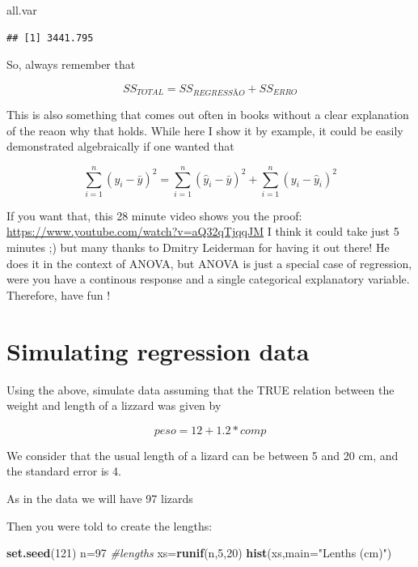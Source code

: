 \documentclass[
]{book}
\newenvironment{Shaded}{\begin{snugshade}}{\end{snugshade}}
\newcommand{\CommentTok}[1]{\textcolor[rgb]{0.56,0.35,0.01}{\textit{#1}}}
\newcommand{\DataTypeTok}[1]{\textcolor[rgb]{0.13,0.29,0.53}{#1}}
\newcommand{\DecValTok}[1]{\textcolor[rgb]{0.00,0.00,0.81}{#1}}
\newcommand{\KeywordTok}[1]{\textcolor[rgb]{0.13,0.29,0.53}{\textbf{#1}}}
\newcommand{\NormalTok}[1]{#1}
\newcommand{\StringTok}[1]{\textcolor[rgb]{0.31,0.60,0.02}{#1}}
\begin{document}
\begin{Shaded}
\begin{Highlighting}[]
\NormalTok{all.var}
\end{Highlighting}
\end{Shaded}

\begin{verbatim}
## [1] 3441.795
\end{verbatim}

So, always remember that

\[SS_{TOTAL}=SS_{REGRESSÃO}+SS_{ERRO}\]

This is also something that comes out often in books without a clear explanation of the reaon why that holds. While here I show it by example, it could be easily demonstrated algebraically if one wanted that

\[\sum_{i=1}^n (y_i- \bar y)^2=\sum_{i=1}^n (\hat y_i- \bar y)^2 + \sum_{i=1}^n (y_i- \hat y_i)^2\]

If you want that, this 28 minute video shows you the proof: \url{https://www.youtube.com/watch?v=aQ32qTjqqJM}
I think it could take just 5 minutes ;) but many thanks to Dmitry Leiderman for having it out there! He does it in the context of ANOVA, but ANOVA is just a special case of regression, were you have a continous response and a single categorical explanatory variable. Therefore, have fun !

\hypertarget{simulating-regression-data}{%
\section{Simulating regression data}\label{simulating-regression-data}}

Using the above, simulate data assuming that the TRUE relation between the weight and length of a lizzard was given by

\[ peso = 12 + 1.2 * comp \]

We consider that the usual length of a lizard can be between 5 and 20 cm, and the standard error is 4.

As in the data we will have 97 lizards

Then you were told to create the lengths:

\begin{Shaded}
\begin{Highlighting}[]
\KeywordTok{set.seed}\NormalTok{(}\DecValTok{121}\NormalTok{)}
\NormalTok{n=}\DecValTok{97}
\CommentTok{#lengths}
\NormalTok{xs=}\KeywordTok{runif}\NormalTok{(n,}\DecValTok{5}\NormalTok{,}\DecValTok{20}\NormalTok{)}
\KeywordTok{hist}\NormalTok{(xs,}\DataTypeTok{main=}\StringTok{"Lenths (cm)"}\NormalTok{)}
\end{Highlighting}
\end{Shaded}
\end{document}
